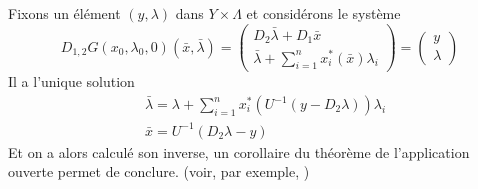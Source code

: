\documentclass[memoire.tex]{subfiles}
\begin{document}
\begin{preuve}
    Fixons un élément $(y,\lambda)$ dans $Y\times \Lambda$ et considérons le système 
    \begin{equation*}
        D_{1,2}G(x_0,\lambda_0,0)(\bar{x},\bar{\lambda})=
        \begin{pmatrix}
                D_2\bar{\lambda}+D_1\bar{x}\\
                \bar{\lambda}+ \sum_{i=1}^n x_i^{*}(\bar{x})\lambda_i
        \end{pmatrix}
        = \begin{pmatrix}
                y\\
                \lambda
        \end{pmatrix}
    \end{equation*}
    Il a l'unique solution
    \begin{align*}
        &\bar{\lambda}= \lambda + \sum_{i=1}^n x^{*}_i(U^{-1}(y-D_2\lambda))\lambda_i\\
        &\bar{x}= U^{-1}(D_2 \lambda - y)
    \end{align*}
Et on a alors calculé son inverse, un corollaire du théorème de l'application ouverte permet de conclure. (voir, par exemple, \cite{rudin1991functional})
\end{preuve}
\end{document}
